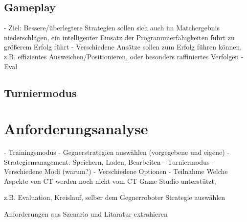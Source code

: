 \subsection{Gameplay}

- Ziel: Bessere/überlegtere Strategien sollen sich auch im Matchergebnis niederschlagen, ein intelligenter Einsatz der Programmierfähigkeiten führt zu größerem Erfolg führt
- Verschiedene Ansätze sollen zum Erfolg führen können, z.B. effizientes Ausweichen/Positionieren, oder besonders raffiniertes Verfolgen
- Eval


\subsection{Turniermodus}
      
\section{Anforderungsanalyse}

- Trainingsmodus
  - Gegnerstrategien auswählen (vorgegebene und eigene)
  - Strategiemanagement: Speichern, Laden, Bearbeiten
- Turniermodus
  - Verschiedene Modi (warum?)
  - Verschiedene Optionen
  - Teilnahme
Welche Aspekte von CT werden noch nicht vom CT Game Studio unterstützt,

z.B. Evaluation, Kreislauf, selber dem Gegnerroboter Strategie auswählen

Anforderungen aus Szenario und Litaratur extrahieren
